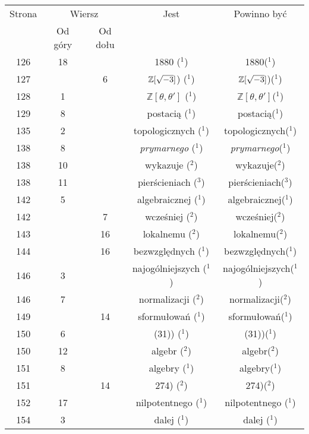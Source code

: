 \documentclass[a4paper,11pt]{article}
\begin{document}
\begin{center}
  \begin{tabular}{|c|c|c|c|c|}
    \hline
    Strona & \multicolumn{2}{c|}{Wiersz} & Jest
                              & Powinno być \\ \cline{2-3}
    & Od góry & Od dołu & & \\
    \hline
    126 & 18 & & 1880 ($^{ 1 }$) & 1880($^{ 1 }$) \\
    127 & &  6 & $\mathbb{Z}[ \sqrt{ -3 } ]$) ($^{ 1 }$)
           & $\mathbb{Z}[ \sqrt{ -3 } ]$)($^{ 1 }$) \\
    128 &  1 & & $\mathbb{Z}[ \theta, \theta' ]$ ($^{ 1 }$)
           & $\mathbb{Z}[ \theta, \theta' ]$($^{ 1 }$) \\
    129 &  8 & & postacią ($^{ 1 }$) & postacią($^{ 1 }$) \\
    135 &  2 & & topologicznych ($^{ 1 }$) & topologicznych($^{ 1 }$) \\
    138 &  8 & & \textit{prymarnego} ($^{ 1 }$)
           & \textit{prymarnego}($^{ 1 }$) \\
    138 & 10 & & wykazuje ($^{ 2 }$) & wykazuje($^{ 2 }$) \\
    138 & 11 & & pierścieniach ($^{ 3 }$) & pierścieniach($^{ 3 }$) \\
    142 &  5 & & algebraicznej ($^{ 1 }$) & algebraicznej($^{ 1 }$) \\
    142 & &  7 & wcześniej ($^{ 2 }$) & wcześniej($^{ 2 }$) \\
    143 & & 16 & lokalnemu ($^{ 2 }$) & lokalnemu($^{ 2 }$) \\
    144 & & 16 & bezwzględnych ($^{ 1 }$) & bezwzględnych($^{ 1 }$) \\
    146 &  3 & & najogólniejszych ($^{ 1 }$) & najogólniejszych($^{ 1 }$) \\
    146 &  7 & & normalizacji ($^{ 2 }$) & normalizacji($^{ 2 }$) \\
    149 & & 14 & sformułowań ($^{ 1 }$) & sformułowań($^{ 1 }$) \\
    150 &  6 & & (31)) ($^{ 1 }$) & (31))($^{ 1 }$) \\
    150 & 12 & & algebr ($^{ 2 }$) & algebr($^{ 2 }$) \\
    151 &  8 & & algebry ($^{ 1 }$) & algebry($^{ 1 }$) \\
    151 & & 14 & 274) ($^{ 2 }$) & 274)($^{ 2 }$) \\
    152 & 17 & & nilpotentnego ($^{ 1 }$) & nilpotentnego ($^{ 1 }$) \\
    154 &  3 & & dalej ($^{ 1 }$) & dalej ($^{ 1 }$) \\

\end{tabular}
\end{center}
\end{document}

